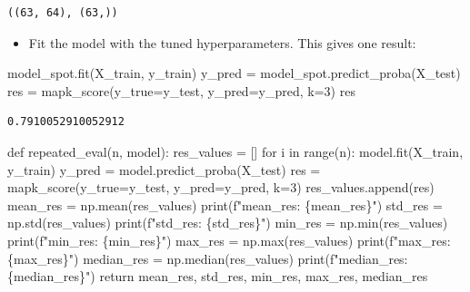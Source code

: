 \documentclass[
  letterpaper,
  DIV=11,
  numbers=noendperiod]{scrreprt}
\newenvironment{Shaded}{\begin{snugshade}}{\end{snugshade}}
\newcommand{\BuiltInTok}[1]{\textcolor[rgb]{0.00,0.23,0.31}{#1}}
\newcommand{\ControlFlowTok}[1]{\textcolor[rgb]{0.00,0.23,0.31}{#1}}
\newcommand{\DecValTok}[1]{\textcolor[rgb]{0.68,0.00,0.00}{#1}}
\newcommand{\KeywordTok}[1]{\textcolor[rgb]{0.00,0.23,0.31}{#1}}
\newcommand{\NormalTok}[1]{\textcolor[rgb]{0.00,0.23,0.31}{#1}}
\newcommand{\OperatorTok}[1]{\textcolor[rgb]{0.37,0.37,0.37}{#1}}
\newcommand{\SpecialCharTok}[1]{\textcolor[rgb]{0.37,0.37,0.37}{#1}}
\newcommand{\SpecialStringTok}[1]{\textcolor[rgb]{0.13,0.47,0.30}{#1}}
\providecommand{\tightlist}{%
  \setlength{\itemsep}{0pt}\setlength{\parskip}{0pt}}\usepackage{longtable,booktabs,array}
\begin{document}
\begin{verbatim}
((63, 64), (63,))
\end{verbatim}

\begin{itemize}
\tightlist
\item
  Fit the model with the tuned hyperparameters. This gives one result:
\end{itemize}

\begin{Shaded}
\begin{Highlighting}[]
\NormalTok{model\_spot.fit(X\_train, y\_train)}
\NormalTok{y\_pred }\OperatorTok{=}\NormalTok{ model\_spot.predict\_proba(X\_test)}
\NormalTok{res }\OperatorTok{=}\NormalTok{ mapk\_score(y\_true}\OperatorTok{=}\NormalTok{y\_test, y\_pred}\OperatorTok{=}\NormalTok{y\_pred, k}\OperatorTok{=}\DecValTok{3}\NormalTok{)}
\NormalTok{res}
\end{Highlighting}
\end{Shaded}

\begin{verbatim}
0.7910052910052912
\end{verbatim}

\begin{Shaded}
\begin{Highlighting}[]
\KeywordTok{def}\NormalTok{ repeated\_eval(n, model):}
\NormalTok{    res\_values }\OperatorTok{=}\NormalTok{ []}
    \ControlFlowTok{for}\NormalTok{ i }\KeywordTok{in} \BuiltInTok{range}\NormalTok{(n):}
\NormalTok{        model.fit(X\_train, y\_train)}
\NormalTok{        y\_pred }\OperatorTok{=}\NormalTok{ model.predict\_proba(X\_test)}
\NormalTok{        res }\OperatorTok{=}\NormalTok{ mapk\_score(y\_true}\OperatorTok{=}\NormalTok{y\_test, y\_pred}\OperatorTok{=}\NormalTok{y\_pred, k}\OperatorTok{=}\DecValTok{3}\NormalTok{)}
\NormalTok{        res\_values.append(res)}
\NormalTok{    mean\_res }\OperatorTok{=}\NormalTok{ np.mean(res\_values)}
    \BuiltInTok{print}\NormalTok{(}\SpecialStringTok{f"mean\_res: }\SpecialCharTok{\{}\NormalTok{mean\_res}\SpecialCharTok{\}}\SpecialStringTok{"}\NormalTok{)}
\NormalTok{    std\_res }\OperatorTok{=}\NormalTok{ np.std(res\_values)}
    \BuiltInTok{print}\NormalTok{(}\SpecialStringTok{f"std\_res: }\SpecialCharTok{\{}\NormalTok{std\_res}\SpecialCharTok{\}}\SpecialStringTok{"}\NormalTok{)}
\NormalTok{    min\_res }\OperatorTok{=}\NormalTok{ np.}\BuiltInTok{min}\NormalTok{(res\_values)}
    \BuiltInTok{print}\NormalTok{(}\SpecialStringTok{f"min\_res: }\SpecialCharTok{\{}\NormalTok{min\_res}\SpecialCharTok{\}}\SpecialStringTok{"}\NormalTok{)}
\NormalTok{    max\_res }\OperatorTok{=}\NormalTok{ np.}\BuiltInTok{max}\NormalTok{(res\_values)}
    \BuiltInTok{print}\NormalTok{(}\SpecialStringTok{f"max\_res: }\SpecialCharTok{\{}\NormalTok{max\_res}\SpecialCharTok{\}}\SpecialStringTok{"}\NormalTok{)}
\NormalTok{    median\_res }\OperatorTok{=}\NormalTok{ np.median(res\_values)}
    \BuiltInTok{print}\NormalTok{(}\SpecialStringTok{f"median\_res: }\SpecialCharTok{\{}\NormalTok{median\_res}\SpecialCharTok{\}}\SpecialStringTok{"}\NormalTok{)}
    \ControlFlowTok{return}\NormalTok{ mean\_res, std\_res, min\_res, max\_res, median\_res}
\end{Highlighting}
\end{Shaded}
\end{document}
